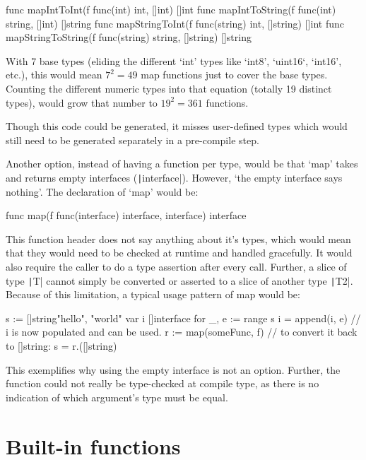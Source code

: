 \begin{gocode}
func mapIntToInt(f func(int) int, []int) []int
func mapIntToString(f func(int) string, []int) []string
func mapStringToInt(f func(string) int, []string) []int
func mapStringToString(f func(string) string, []string) []string
\end{gocode}

With 7 base types (eliding the different `int' types like `int8', `uint16`, `int16', etc.), this would
mean $7^{2} = 49$ map functions just to cover the base types. Counting the different numeric
types into that equation (totally 19 distinct types\autocite{go-basetypes}), would grow that number to $19^{2} = 361$ functions.

Though this code could be generated, it misses user-defined types which would still
need to be generated separately in a pre-compile step.

Another option, instead of having a function per type, would be that `map' takes and returns empty interfaces
(\texttt|interface{}|). However, `the empty interface says
nothing'\autocite{empty-interface}. The declaration of `map' would be:
\begin{gocode}
	func map(f func(interface{}) interface{}, interface{}) interface{}
\end{gocode}

This function header does not say anything about it's types, which would
mean that they would need to be checked at runtime and handled gracefully. It
would also require the caller to do a type assertion after every call. Further,
a slice of type \texttt|T| cannot simply be converted or asserted to a slice of another type
\texttt|T2|\autocite{go-interface-slice-conv}\autocite{go-interface-slice-conv2}.
Because of this limitation, a typical usage pattern of map would be:
\begin{gocode}
s := []string{"hello", "world"}
var i []interface{}
for _, e := range s {
	i = append(i, e)
}
// i is now populated and can be used.
r := map(someFunc, f)
// to convert it back to []string:
s = r.([]string)
\end{gocode}

This exemplifies why using the empty interface is not an option. Further, the
function could not really be type-checked at compile type, as there is no indication
of which argument's type must be equal.

\section{Built-in functions}

